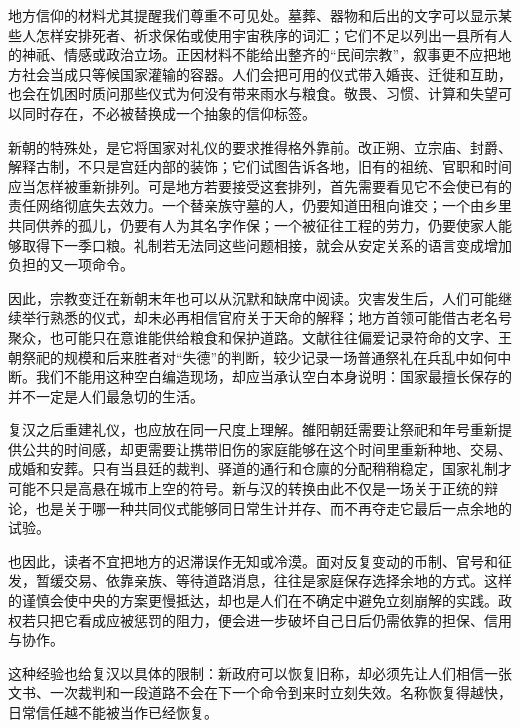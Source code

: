 地方信仰的材料尤其提醒我们尊重不可见处。墓葬、器物和后出的文字可以显示某些人怎样安排死者、祈求保佑或使用宇宙秩序的词汇；它们不足以列出一县所有人的神祇、情感或政治立场。正因材料不能给出整齐的“民间宗教”，叙事更不应把地方社会当成只等候国家灌输的容器。人们会把可用的仪式带入婚丧、迁徙和互助，也会在饥困时质问那些仪式为何没有带来雨水与粮食。敬畏、习惯、计算和失望可以同时存在，不必被替换成一个抽象的信仰标签。

新朝的特殊处，是它将国家对礼仪的要求推得格外靠前。改正朔、立宗庙、封爵、解释古制，不只是宫廷内部的装饰；它们试图告诉各地，旧有的祖统、官职和时间应当怎样被重新排列。可是地方若要接受这套排列，首先需要看见它不会使已有的责任网络彻底失去效力。一个替亲族守墓的人，仍要知道田租向谁交；一个由乡里共同供养的孤儿，仍要有人为其名字作保；一个被征往工程的劳力，仍要使家人能够取得下一季口粮。礼制若无法同这些问题相接，就会从安定关系的语言变成增加负担的又一项命令。

因此，宗教变迁在新朝末年也可以从沉默和缺席中阅读。灾害发生后，人们可能继续举行熟悉的仪式，却未必再相信官府关于天命的解释；地方首领可能借古老名号聚众，也可能只在意谁能供给粮食和保护道路。文献往往偏爱记录符命的文字、王朝祭祀的规模和后来胜者对“失德”的判断，较少记录一场普通祭礼在兵乱中如何中断。我们不能用这种空白编造现场，却应当承认空白本身说明：国家最擅长保存的并不一定是人们最急切的生活。

复汉之后重建礼仪，也应放在同一尺度上理解。雒阳朝廷需要让祭祀和年号重新提供公共的时间感，却更需要让携带旧伤的家庭能够在这个时间里重新种地、交易、成婚和安葬。只有当县廷的裁判、驿道的通行和仓廪的分配稍稍稳定，国家礼制才可能不只是高悬在城市上空的符号。新与汉的转换由此不仅是一场关于正统的辩论，也是关于哪一种共同仪式能够同日常生计并存、而不再夺走它最后一点余地的试验。

也因此，读者不宜把地方的迟滞误作无知或冷漠。面对反复变动的币制、官号和征发，暂缓交易、依靠亲族、等待道路消息，往往是家庭保存选择余地的方式。这样的谨慎会使中央的方案更慢抵达，却也是人们在不确定中避免立刻崩解的实践。政权若只把它看成应被惩罚的阻力，便会进一步破坏自己日后仍需依靠的担保、信用与协作。

这种经验也给复汉以具体的限制：新政府可以恢复旧称，却必须先让人们相信一张文书、一次裁判和一段道路不会在下一个命令到来时立刻失效。名称恢复得越快，日常信任越不能被当作已经恢复。
